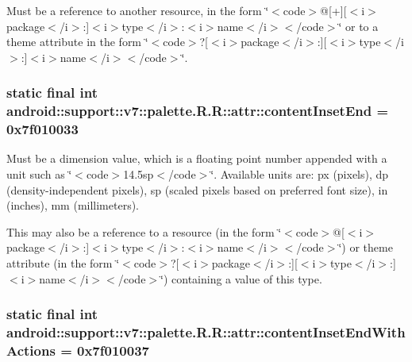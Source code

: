 Must be a reference to another resource, in the form \char`\"{}$<$code$>$@\mbox{[}+\mbox{]}\mbox{[}$<$i$>$package$<$/i$>$:\mbox{]}$<$i$>$type$<$/i$>$:$<$i$>$name$<$/i$>$$<$/code$>$\char`\"{} or to a theme attribute in the form \char`\"{}$<$code$>$?\mbox{[}$<$i$>$package$<$/i$>$:\mbox{]}\mbox{[}$<$i$>$type$<$/i$>$:\mbox{]}$<$i$>$name$<$/i$>$$<$/code$>$\char`\"{}. \hypertarget{classandroid_1_1support_1_1v7_1_1palette_1_1_r_1_1attr_a57b14d48ec1e960534977967c7754a0}{
\subsubsection[{contentInsetEnd}]{\setlength{\rightskip}{0pt plus 5cm}static final int android::support::v7::palette.R.R::attr::contentInsetEnd = 0x7f010033}}
\label{classandroid_1_1support_1_1v7_1_1palette_1_1_r_1_1attr_a57b14d48ec1e960534977967c7754a0}


Must be a dimension value, which is a floating point number appended with a unit such as \char`\"{}$<$code$>$14.5sp$<$/code$>$\char`\"{}. Available units are: px (pixels), dp (density-independent pixels), sp (scaled pixels based on preferred font size), in (inches), mm (millimeters). 

This may also be a reference to a resource (in the form \char`\"{}$<$code$>$@\mbox{[}$<$i$>$package$<$/i$>$:\mbox{]}$<$i$>$type$<$/i$>$:$<$i$>$name$<$/i$>$$<$/code$>$\char`\"{}) or theme attribute (in the form \char`\"{}$<$code$>$?\mbox{[}$<$i$>$package$<$/i$>$:\mbox{]}\mbox{[}$<$i$>$type$<$/i$>$:\mbox{]}$<$i$>$name$<$/i$>$$<$/code$>$\char`\"{}) containing a value of this type. \hypertarget{classandroid_1_1support_1_1v7_1_1palette_1_1_r_1_1attr_8b58e55b7040b6f7a9b02757cf2c0c09}{
\subsubsection[{contentInsetEndWithActions}]{\setlength{\rightskip}{0pt plus 5cm}static final int android::support::v7::palette.R.R::attr::contentInsetEndWithActions = 0x7f010037}}
\label{classandroid_1_1support_1_1v7_1_1palette_1_1_r_1_1attr_8b58e55b7040b6f7a9b02757cf2c0c09}


